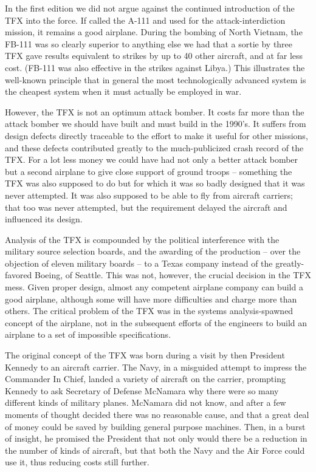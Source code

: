 In the first edition we did not argue against the continued introduction of the TFX into the force. If called the A-111 and used for the attack-interdiction mission, it remains a good airplane. During the bombing of North Vietnam, the FB-111 was so clearly superior to anything else we had that a sortie by three TFX gave results equivalent to strikes by up to 40 other aircraft, and at far less cost. (FB-111 was also effective in the strikes against Libya.) This illustrates the well-known principle that in general the most technologically advanced system is the cheapest system when it must actually be employed in war.

However, the TFX is not an optimum attack bomber. It costs far more than the attack bomber we should have built and must build in the 1990's. It suffers from design defects directly traceable to the effort to make it useful for other missions, and these defects contributed greatly to the much-publicized crash record of the TFX. For a lot less money we could have had not only a better attack bomber but a second airplane to give close support of ground troops -- something the TFX was also supposed to do but for which it was so badly designed that it was never attempted. It was also supposed to be able to fly from aircraft carriers; that too was never attempted, but the requirement delayed the aircraft and influenced its design.

Analysis of the TFX is compounded by the political interference with the military source selection boards, and the awarding of the production -- over the objection of eleven military boards -- to a Texas company instead of the greatly-favored Boeing, of Seattle. This was not, however, the crucial decision in the TFX mess. Given proper design, almost any competent airplane company can build a good airplane, although some will have more difficulties and charge more than others. The critical problem of the TFX was in the systems analysis-spawned concept of the airplane, not in the subsequent efforts of the engineers to build an airplane to a set of impossible specifications.

The original concept of the TFX was born during a visit by then President Kennedy to an aircraft carrier. The Navy, in a misguided attempt to impress the Commander In Chief, landed a variety of aircraft on the carrier, prompting Kennedy to ask Secretary of Defense McNamara why there were so many different kinds of military planes. McNamara did not know, and after a few moments of thought decided there was no reasonable cause, and that a great deal of money could be saved by building general purpose machines. Then, in a burst of insight, he promised the President that not only would there be a reduction in the number of kinds of aircraft, but that both the Navy and the Air Force could use it, thus reducing costs still further.

